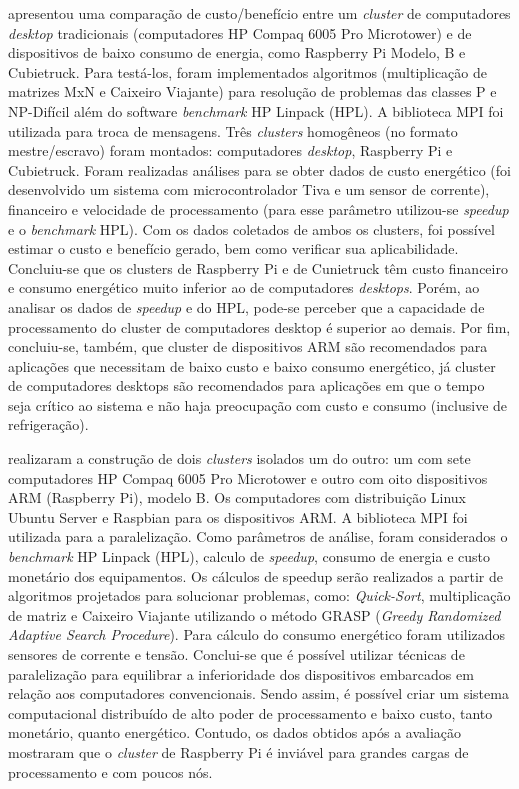 \citet{godoi:2015:estudo}  apresentou uma comparação de custo/benefício entre um \textit{cluster} de computadores \textit{desktop} tradicionais (computadores HP Compaq 6005 Pro Microtower) e de dispositivos de baixo consumo de energia, como Raspberry Pi Modelo, B e Cubietruck. Para testá-los, foram implementados algoritmos (multiplicação de matrizes MxN e Caixeiro Viajante) para resolução de problemas das classes P e NP-Difícil além do software \textit{benchmark} HP Linpack (HPL). A biblioteca MPI foi utilizada para troca de mensagens. Três \textit{clusters} homogêneos (no formato mestre/escravo) foram montados: computadores \textit{desktop}, Raspberry Pi e Cubietruck. Foram realizadas análises para se obter dados de custo energético (foi desenvolvido um sistema com microcontrolador Tiva e um sensor de corrente), financeiro e velocidade de processamento (para esse parâmetro utilizou-se \textit{speedup} e o \textit{benchmark} HPL). Com os dados coletados de ambos os clusters, foi possível estimar o custo e benefício gerado, bem como verificar sua aplicabilidade. Concluiu-se que os clusters de Raspberry Pi e de Cunietruck têm custo financeiro e consumo energético muito inferior ao de computadores \textit{desktops}. Porém, ao analisar os dados de \textit{speedup} e do HPL, pode-se perceber que a capacidade de processamento do cluster de computadores desktop é superior ao demais. Por fim, concluiu-se, também, que cluster de dispositivos ARM são recomendados para aplicações que necessitam de baixo custo e baixo consumo energético, já cluster de computadores desktops são recomendados para aplicações em que o tempo seja crítico ao sistema e não haja preocupação com custo e consumo (inclusive de refrigeração).

\citet{erckumecka:2015:avaliacao} realizaram a construção de dois \textit{clusters} isolados um do outro: um com sete computadores HP Compaq 6005 Pro Microtower e outro com oito dispositivos ARM (Raspberry Pi), modelo B. Os computadores com distribuição Linux Ubuntu Server e Raspbian para os dispositivos ARM. A biblioteca MPI foi utilizada para a paralelização. Como parâmetros de análise, foram considerados o \textit{benchmark} HP Linpack (HPL), calculo de \textit{speedup}, consumo de energia e custo monetário dos equipamentos. Os cálculos de speedup serão realizados a partir de algoritmos projetados para solucionar problemas, como: \textit{Quick-Sort}, multiplicação de matriz e Caixeiro Viajante utilizando o método GRASP (\textit{Greedy Randomized Adaptive Search Procedure}). Para cálculo do consumo energético foram utilizados sensores de corrente e tensão. Conclui-se que é possível utilizar técnicas de paralelização para equilibrar a inferioridade dos dispositivos embarcados em relação aos computadores convencionais. Sendo assim, é possível criar um sistema computacional distribuído de alto poder de processamento e baixo custo, tanto monetário, quanto energético. Contudo, os dados obtidos após a avaliação mostraram que o \textit{cluster} de Raspberry Pi é inviável para grandes cargas de processamento e com poucos nós.

